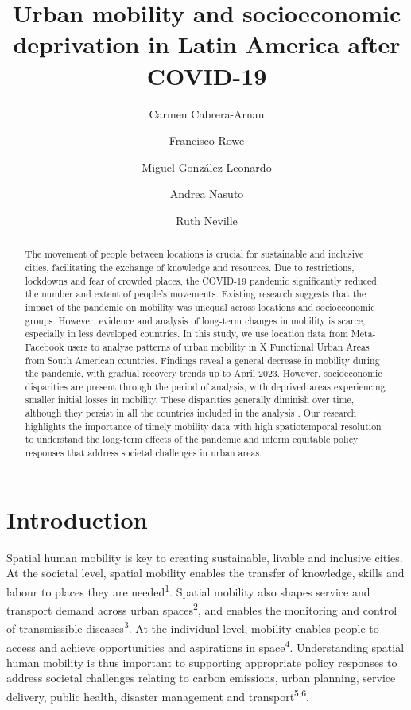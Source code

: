 \documentclass[
  11pt,
]{article}
\title{\textbf{Urban mobility and socioeconomic deprivation in Latin
America after COVID-19}}
\author[1]{Carmen Cabrera-Arnau}
\author[1]{Francisco Rowe}
\author[2]{Miguel González-Leonardo}
\author[1]{Andrea Nasuto}
\author[1]{Ruth Neville}
\affil[1]{Geographic Data Science Lab, Department of Geography and
Planning, University of Liverpool, Liverpool, UK}
\affil[2]{Centre for Demographic Urban and Environmental Studies, El
Colegio de México, Ciudad de México, México}
\date{}
\begin{document}
\maketitle
\begin{abstract}
The movement of people between locations is crucial for sustainable and
inclusive cities, facilitating the exchange of knowledge and resources.
Due to restrictions, lockdowns and fear of crowded places, the COVID-19
pandemic significantly reduced the number and extent of people's
movements. Existing research suggests that the impact of the pandemic on
mobility was unequal across locations and socioeconomic groups. However,
evidence and analysis of long-term changes in mobility is scarce,
especially in less developed countries. In this study, we use location
data from Meta-Facebook users to analyse patterns of urban mobility in X
Functional Urban Areas from South American countries. Findings reveal a
general decrease in mobility during the pandemic, with gradual recovery
trends up to April 2023. However, socioeconomic disparities are present
through the period of analysis, with deprived areas experiencing smaller
initial losses in mobility. These disparities generally diminish over
time, although they persist in all the countries included in the
analysis . Our research highlights the importance of timely mobility
data with high spatiotemporal resolution to understand the long-term
effects of the pandemic and inform equitable policy responses that
address societal challenges in urban areas.
\end{abstract}

\hfill\break

\section{Introduction}\label{sec-intro}

Spatial human mobility is key to creating sustainable, livable and
inclusive cities. At the societal level, spatial mobility enables the
transfer of knowledge, skills and labour to places they are
needed\textsuperscript{1}. Spatial mobility also shapes service and
transport demand across urban spaces\textsuperscript{2}, and enables the
monitoring and control of transmissible diseases\textsuperscript{3}. At
the individual level, mobility enables people to access and achieve
opportunities and aspirations in space\textsuperscript{4}. Understanding
spatial human mobility is thus important to supporting appropriate
policy responses to address societal challenges relating to carbon
emissions, urban planning, service delivery, public health, disaster
management and transport\textsuperscript{5,6}.
\end{document}
